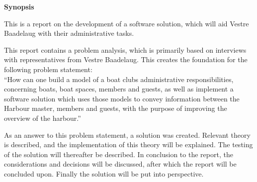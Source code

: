 \begin{center}\textbf{Synopsis}\\ \end{center}

This is a report on the development of a software solution, which will aid Vestre Baadelaug with their administrative tasks.

This report contains a problem analysis, which is primarily based on interviews with representatives from Vestre Baadelaug. This creates the foundation for the following problem statement:\\

\enquote{How can one build a model of a boat clubs administrative responsibilities, concerning boats, boat spaces, members and guests, as well as implement a software solution which uses those models to convey information between the Harbour master, members and guests, with the purpose of improving the overview of the harbour.}

As an answer to this problem statement, a solution was created. Relevant theory is described, and the implementation of this theory will be explained. The testing of the solution will thereafter be described.
In conclusion to the report, the considerations and decisions will be discussed, after which the report will be concluded upon. Finally the solution will be put into perspective.
